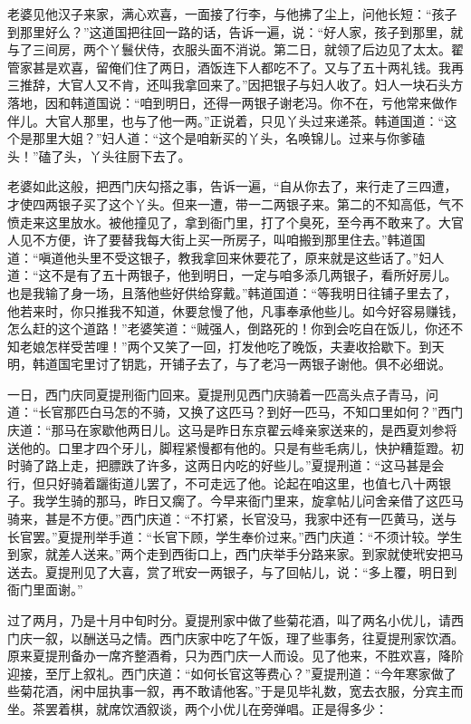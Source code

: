 老婆见他汉子来家，满心欢喜，一面接了行李，与他拂了尘上，问他长短：“孩子到那里好么？”这道国把往回一路的话，告诉一遍，说：“好人家，孩子到那里，就与了三间房，两个丫鬟伏侍，衣服头面不消说。第二日，就领了后边见了太太。翟管家甚是欢喜，留俺们住了两日，酒饭连下人都吃不了。又与了五十两礼钱。我再三推辞，大官人又不肯，还叫我拿回来了。”因把银子与妇人收了。妇人一块石头方落地，因和韩道国说：“咱到明日，还得一两银子谢老冯。你不在，亏他常来做作伴儿。大官人那里，也与了他一两。”正说着，只见丫头过来递茶。韩道国道：“这个是那里大姐？”妇人道：“这个是咱新买的丫头，名唤锦儿。过来与你爹磕头！”磕了头，丫头往厨下去了。

老婆如此这般，把西门庆勾搭之事，告诉一遍，“自从你去了，来行走了三四遭，才使四两银子买了这个丫头。但来一遭，带一二两银子来。第二的不知高低，气不愤走来这里放水。被他撞见了，拿到衙门里，打了个臭死，至今再不敢来了。大官人见不方便，许了要替我每大街上买一所房子，叫咱搬到那里住去。”韩道国道：“嗔道他头里不受这银子，教我拿回来休要花了，原来就是这些话了。”妇人道：“这不是有了五十两银子，他到明日，一定与咱多添几两银子，看所好房儿。也是我输了身一场，且落他些好供给穿戴。”韩道国道：“等我明日往铺子里去了，他若来时，你只推我不知道，休要怠慢了他，凡事奉承他些儿。如今好容易赚钱，怎么赶的这个道路！”老婆笑道：“贼强人，倒路死的！你到会吃自在饭儿，你还不知老娘怎样受苦哩！”两个又笑了一回，打发他吃了晚饭，夫妻收拾歇下。到天明，韩道国宅里讨了钥匙，开铺子去了，与了老冯一两银子谢他。俱不必细说。

一日，西门庆同夏提刑衙门回来。夏提刑见西门庆骑着一匹高头点子青马，问道：“长官那匹白马怎的不骑，又换了这匹马？到好一匹马，不知口里如何？”西门庆道：“那马在家歇他两日儿。这马是昨日东京翟云峰亲家送来的，是西夏刘参将送他的。口里才四个牙儿，脚程紧慢都有他的。只是有些毛病儿，快护糟踅蹬。初时骑了路上走，把膘跌了许多，这两日内吃的好些儿。”夏提刑道：“这马甚是会行，但只好骑着躧街道儿罢了，不可走远了他。论起在咱这里，也值七八十两银子。我学生骑的那马，昨日又瘸了。今早来衙门里来，旋拿帖儿问舍亲借了这匹马骑来，甚是不方便。”西门庆道：“不打紧，长官没马，我家中还有一匹黄马，送与长官罢。”夏提刑举手道：“长官下顾，学生奉价过来。”西门庆道：“不须计较。学生到家，就差人送来。”两个走到西街口上，西门庆举手分路来家。到家就使玳安把马送去。夏提刑见了大喜，赏了玳安一两银子，与了回帖儿，说：“多上覆，明日到衙门里面谢。”

过了两月，乃是十月中旬时分。夏提刑家中做了些菊花酒，叫了两名小优儿，请西门庆一叙，以酬送马之情。西门庆家中吃了午饭，理了些事务，往夏提刑家饮酒。原来夏提刑备办一席齐整酒肴，只为西门庆一人而设。见了他来，不胜欢喜，降阶迎接，至厅上叙礼。西门庆道：“如何长官这等费心？”夏提刑道：“今年寒家做了些菊花酒，闲中屈执事一叙，再不敢请他客。”于是见毕礼数，宽去衣服，分宾主而坐。茶罢着棋，就席饮酒叙谈，两个小优儿在旁弹唱。正是得多少：

